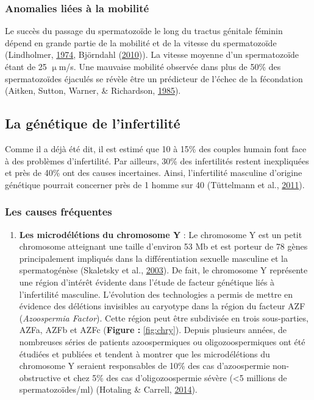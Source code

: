 \documentclass[12pt,twoside]{reedthesis}
\providecommand{\tightlist}{%
  \setlength{\itemsep}{0pt}\setlength{\parskip}{0pt}}
\theoremstyle{definition}
\theoremstyle{definition}
\theoremstyle{remark}
\begin{document}
  \subsubsection{Anomalies liées à la
  mobilité}\label{anomalies-liees-a-la-mobilite}
  
  Le succès du passage du spermatozoïde le long du tractus génitale
  féminin dépend en grande partie de la mobilité et de la vitesse du
  spermatozoïde (Lindholmer, \protect\hyperlink{ref-Lindholmer1974}{1974},
  Björndahl (\protect\hyperlink{ref-Bjorndahl2010}{2010})). La vitesse
  moyenne d'un spermatozoïde étant de 25 \(\upmu\)m/s. Une mauvaise
  mobilité observée dans plus de 50\% des spermatozoïdes éjaculés se
  révèle être un prédicteur de l'échec de la fécondation (Aitken, Sutton,
  Warner, \& Richardson, \protect\hyperlink{ref-Aitken1985}{1985}).
  
  \subsection{La génétique de
  l'infertilité}\label{la-genetique-de-linfertilite}
  
  Comme il a déjà été dit, il est estimé que 10 à 15\% des couples humain
  font face à des problèmes d'infertilité. Par ailleurs, 30\% des
  infertilités restent inexpliquées et près de 40\% ont des causes
  incertaines. Ainsi, l'infertilité masculine d'origine génétique pourrait
  concerner près de 1 homme sur 40 (Tüttelmann et al.,
  \protect\hyperlink{ref-Tuttelmann2011}{2011}).
  
  \subsubsection{Les causes fréquentes}\label{les-causes-frequentes}
  
  \begin{enumerate}
  \def\labelenumi{\arabic{enumi}.}
  \tightlist
  \item
    \textbf{Les microdélétions du chromosome Y} : Le chromosome Y est un
    petit chromosome atteignant une taille d'environ 53 Mb et est porteur
    de 78 gènes principalement impliqués dans la différentiation sexuelle
    masculine et la spermatogénèse (Skaletsky et al.,
    \protect\hyperlink{ref-Skaletsky2003}{2003}). De fait, le chromosome Y
    représente une région d'intérêt évidente dans l'étude de facteur
    génétique liés à l'infertilité masculine. L'évolution des technologies
    a permis de mettre en évidence des délétions invisibles au caryotype
    dans la région du facteur AZF (\emph{Azoospermia Factor}). Cette
    région peut être subdivisée en trois sous-parties, AZFa, AZFb et AZFc
    (\textbf{Figure :} \ref{fig:chry}). Depuis plusieurs années, de
    nombreuses séries de patients azoospermiques ou oligozoospermiques ont
    été étudiées et publiées et tendent à montrer que les microdélétions
    du chromosome Y seraient responsables de 10\% des cas d'azoospermie
    non-obstructive et chez 5\% des cas d'oligozoospermie sévère
    (\textless{}5 millions de spermatozoïdes/ml) (Hotaling \& Carrell,
    \protect\hyperlink{ref-Hotaling2014}{2014}).
  \end{enumerate}
  
\end{document}
